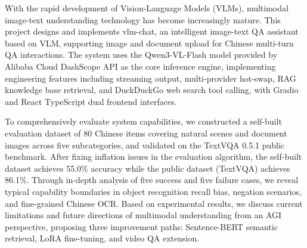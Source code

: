 

\begin{abstract}
  随着视觉语言模型（Vision-Language Model, VLM）的快速发展，多模态图文理解技术日趋成熟。本项目设计并实现了一个基于VLM的智能图文问答助手——vlm-chat，支持用户上传图片和文档并进行中文多轮问答交互。系统以阿里云DashScope API提供的Qwen3-VL-Flash模型为核心推理引擎，实现了流式输出、多Provider热切换、RAG知识库检索、DuckDuckGo联网工具调用等工程特性，并构建了Gradio + React TypeScript双前端交互界面。

  为全面评估系统能力，本项目构建了包含80条中文数据的自建评测集（覆盖自然场景与文档图像两大类、五子类别），并在TextVQA 0.5.1公开数据集上进行了验证。修复评测算法中的虚高问题后，自建集准确率为55.0\%，公开集（TextVQA）准确率为86.1\%。通过5个成功案例和5个失败案例的深度分析，揭示了模型在物体识别召回偏差、否定回答场景、中文OCR细粒度等方面的典型能力边界。基于实验结果，从AGI视角讨论了多模态理解的当前局限与未来方向，提出了Sentence-BERT语义检索、LoRA微调和视频问答扩展三条改进路径。
\end{abstract}

\begin{abstract*}
  With the rapid development of Vision-Language Models (VLMs), multimodal image-text understanding technology has become increasingly mature. This project designs and implements vlm-chat, an intelligent image-text QA assistant based on VLM, supporting image and document upload for Chinese multi-turn QA interactions. The system uses the Qwen3-VL-Flash model provided by Alibaba Cloud DashScope API as the core inference engine, implementing engineering features including streaming output, multi-provider hot-swap, RAG knowledge base retrieval, and DuckDuckGo web search tool calling, with Gradio and React TypeScript dual frontend interfaces.

  To comprehensively evaluate system capabilities, we constructed a self-built evaluation dataset of 80 Chinese items covering natural scenes and document images across five subcategories, and validated on the TextVQA 0.5.1 public benchmark. After fixing inflation issues in the evaluation algorithm, the self-built dataset achieves 55.0\% accuracy while the public dataset (TextVQA) achieves 86.1\%. Through in-depth analysis of five success and five failure cases, we reveal typical capability boundaries in object recognition recall bias, negation scenarios, and fine-grained Chinese OCR. Based on experimental results, we discuss current limitations and future directions of multimodal understanding from an AGI perspective, proposing three improvement paths: Sentence-BERT semantic retrieval, LoRA fine-tuning, and video QA extension.
\end{abstract*}
